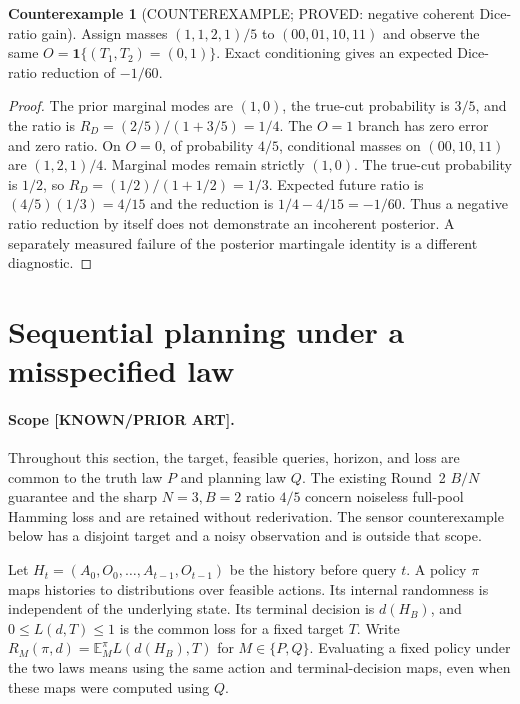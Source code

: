 \documentclass[11pt]{article}
\newcommand{\E}{\mathbb E}
\newcommand{\TV}{\operatorname{TV}}
\theoremstyle{definition}
\newtheorem{counterexample}[theorem]{Counterexample}
\theoremstyle{remark}
\begin{document}
\begin{counterexample}[COUNTEREXAMPLE; PROVED: negative coherent Dice-ratio gain]
Assign masses $(1,1,2,1)/5$ to $(00,01,10,11)$ and observe the same
$O=\mathbf{1}\{(T_1,T_2)=(0,1)\}$. Exact conditioning gives an expected
Dice-ratio reduction of $-1/60$.
\end{counterexample}
\begin{proof}
The prior marginal modes are $(1,0)$, the true-cut probability is $3/5$,
and the ratio is
$R_D=(2/5)/(1+3/5)=1/4$.
The $O=1$ branch has zero error and zero ratio.
On $O=0$, of probability $4/5$, conditional masses on $(00,10,11)$
are $(1,2,1)/4$. Marginal modes remain strictly $(1,0)$.
The true-cut probability is $1/2$, so
$R_D=(1/2)/(1+1/2)=1/3$.
Expected future ratio is $(4/5)(1/3)=4/15$ and the reduction is
$1/4-4/15=-1/60$.
Thus a negative ratio reduction by itself does not demonstrate an
incoherent posterior. A separately measured failure of the posterior
martingale identity is a different diagnostic.
\end{proof}



\section{Sequential planning under a misspecified law}

\paragraph{Scope [KNOWN/PRIOR ART].}
Throughout this section, the target, feasible queries, horizon, and loss are
common to the truth law $P$ and planning law $Q$.  The existing Round~2
$B/N$ guarantee and the sharp $N=3,B=2$ ratio $4/5$ concern noiseless
full-pool Hamming loss and are retained without rederivation.  The sensor
counterexample below has a disjoint target and a noisy observation and is
outside that scope.

Let $H_t=(A_0,O_0,\ldots,A_{t-1},O_{t-1})$ be the history before query $t$.
A policy $\pi$ maps histories to distributions over feasible actions.
Its internal randomness is independent of the underlying state.  Its
terminal decision is $d(H_B)$, and $0\leq L(d,T)\leq1$ is the common loss
for a fixed target $T$.  Write $R_M(\pi,d)=\E_M^\pi L(d(H_B),T)$ for
$M\in\{P,Q\}$.  Evaluating a fixed policy under the two laws means using
the same action and terminal-decision maps, even when these maps were
computed using $Q$.
\end{document}
